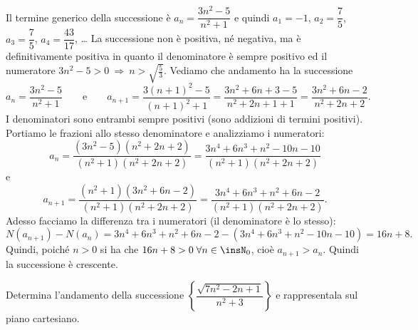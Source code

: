 \begin{exrig}
\begin{esempio}
Il termine generico della successione è $a_n = \dfrac{3n^2-5}{n^2+1}$ e quindi $a_1=-1$, $a_2=\dfrac{7}{5}$, $a_3=\dfrac{7}{5}$, $a_4=\dfrac{43}{17}$, \ldots{} La successione non è positiva, né negativa, ma è definitivamente positiva in quanto il denominatore è sempre positivo ed il numeratore $3n^2-5 > 0 \:\Rightarrow\: n>\sqrt{\frac{5}{3}}$. Vediamo che andamento ha la successione
\[a_n = \dfrac{3n^2-5}{n^2+1}\qquad\text{e}\qquad a_{n+1} = \dfrac{3(n+1)^2-5}{(n+1)^2+1} = \dfrac{3n^2+6n+3-5}{n^2+2n+1+1} = \dfrac{3n^2+6n-2}{n^2+2n+2}.\]
I denominatori sono entrambi sempre positivi (sono addizioni di termini positivi). Portiamo le frazioni allo stesso denominatore e analizziamo i numeratori:
\[a_n = \dfrac{(3n^2-5)(n^2+2n+2)}{(n^2+1)(n^2+2n+2)} = \dfrac{3n^4+6n^3+n^2-10n-10}{(n^2+1)(n^2+2n+2)}\]
e
\[a_{n+1} = \dfrac{(n^2+1)(3n^2+6n-2)}{(n^2+1)(n^2+2n+2)} = \dfrac{3n^4+6n^3+n^2+6n-2}{(n^2+1)(n^2+2n+2)}.\]
Adesso facciamo la differenza tra i numeratori (il denominatore è lo stesso):
\[N(a_{n+1}) - N(a_n) = 3n^4+6n^3+n^2+6n-2 - \left(3n^4+6n^3+n^2-10n-10\right) = 16n+8.\]
Quindi, poiché $n>0$ si ha che $16n+8>0\; \forall n \in \insN_0$, cioè $a_{n+1} > a_n$. Quindi la successione è crescente.
\begin{center}
 
\end{center}
\end{esempio}

\begin{esempio}
Determina l'andamento della successione $\left\{\dfrac{\sqrt{7n^2-2n+1}}{n^2+3}\right\}$  e rappresentala sul piano cartesiano.


\end{esempio}
\end{exrig}
